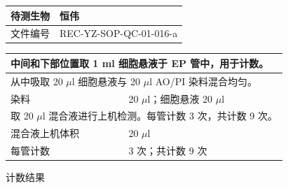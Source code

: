 \documentclass[UTF8,10pt,a4paper,fontset=fandol]{ctexart}
\newcommand{\fieldvalue}[1]{#1}
\newcommand{\handwritten}[1]{#1}
\begin{document}
\begin{center}
\begin{center}
\noindent
\begin{tabularx}{\textwidth}{|p{}|X|}
\hline
待测生物 &
\fieldvalue{\handwritten{恒伟}} \\
\hline
文件编号 & REC-YZ-SOP-QC-01-016-a \\
\hline
\end{tabularx}

\medskip

\begin{tabularx}{\textwidth}{|p{}|X|}
\hline
\multicolumn{2}{|l|}{中间和下部位置取 1 ml 细胞悬液于 EP 管中，用于计数。} \\
\hline
\multicolumn{2}{|l|}{从中吸取 20 $\mu$l 细胞悬液与 20 $\mu$l AO/PI 染料混合均匀。} \\
\hline
染料 &
\fieldvalue{\handwritten{20}} $\mu$l；细胞悬液
\fieldvalue{\handwritten{20}} $\mu$l \\
\hline
\multicolumn{2}{|l|}{取 20 $\mu$l 混合液进行上机检测。每管计数 3 次，共计数 9 次。} \\
\hline
混合液上机体积 &
\fieldvalue{\handwritten{20}} $\mu$l \\
\hline
每管计数 &
\fieldvalue{\handwritten{3}} 次；共计数
\fieldvalue{\handwritten{9}} 次 \\
\hline
\end{tabularx}

\begin{center}
计数结果
\end{center}


\end{center}
\end{center}
\end{document}
